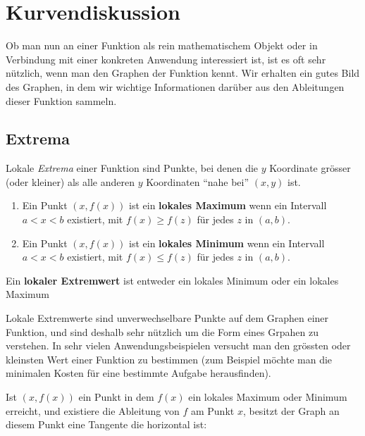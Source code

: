 \chapter{Kurvendiskussion}


Ob man nun an einer Funktion als rein mathematischem Objekt oder in Verbindung mit einer konkreten Anwendung interessiert ist, ist es oft sehr nützlich, wenn man den Graphen der Funktion kennt. Wir erhalten ein gutes Bild des Graphen, in dem wir wichtige Informationen darüber aus den Ableitungen dieser Funktion sammeln.


\section{Extrema}

Lokale \textit{Extrema} einer Funktion sind Punkte, bei denen die 
$y$ Koordinate grösser (oder kleiner) als alle anderen $y$ Koordinaten ``nahe bei'' $(x,y)$ ist. 

\begin{definition}\hfil{}
\begin{enumerate}
\item Ein Punkt $(x,f(x))$ ist ein \textbf{lokales Maximum} wenn ein Intervall $a<x<b$ existiert, mit  $f(x)\ge f(z)$ für
  jedes $z$ in $(a,b)$.
\item Ein Punkt $(x,f(x))$ ist ein \textbf{lokales Minimum}  wenn ein Intervall 
  $a<x<b$ existiert, mit $f(x)\le f(z)$ für jedes $z$ in
  $(a,b)$.
\end{enumerate}
Ein \textbf{lokaler Extremwert} ist entweder ein lokales Minimum oder ein lokales Maximum
\end{definition}

Lokale Extremwerte sind unverwechselbare Punkte auf dem Graphen einer Funktion, und sind deshalb  sehr nützlich um die Form eines Grpahen zu verstehen. In sehr vielen Anwendungsbeispielen versucht man den grössten oder kleinsten Wert einer Funktion zu bestimmen (zum Beispiel möchte man die minimalen Kosten für eine bestimmte Aufgabe herausfinden).

Ist $(x,f(x))$ ein Punkt in dem $f(x)$ ein lokales Maximum oder Minimum erreicht, und existiere die Ableitung von $f$ am Punkt $x$, besitzt der Graph an diesem Punkt eine Tangente die horizontal ist:


